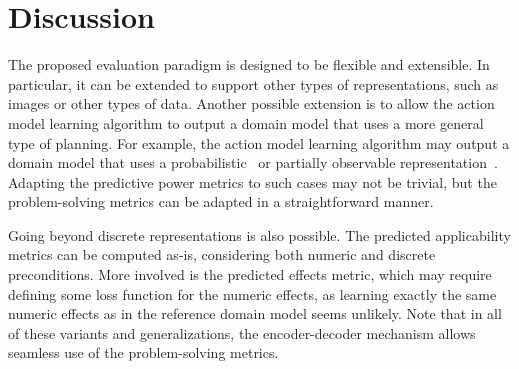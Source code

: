 \documentclass{article}
\theoremstyle{definition}
\theoremstyle{remark}
\newcommand{\sam}{\ac{SAM}\xspace}
\newif\ifaddcomments
\newcommand{\roni}[1]{\ifaddcomments{\textcolor{red}{[Roni: #1]}}\fi}
\newcommand{\argaman}[1]{\ifaddcomments{\textcolor{blue}{[Argaman: #1]}}\fi}
\begin{document}
\argaman{
\paragraph{Problem-Solving Metrics:} 
OffLAM achieved the highest problem-solving rates across all domains. Notably, in four domains, it was the only algorithm to produce a model capable of solving the entire test set. In the \textsc{rovers}, \textsc{elevators}, \textsc{tpp}, and \textsc{nomystery} domains, both \sam and NOLAM added excessive preconditions that reduced the models' applicability, leading to lower success rates. An exception is the \textsc{childsnack} domain, which includes a constant unsupported by both NOLAM and OffLAM. Although plans were generated, they were deemed inapplicable, as shown in Figure~\ref{fig:false-positive-plans}.
}




\section{Discussion}
\roni{For all: please read and let me know what you think by adding comments in the text (e.g., add text like this ``[[YourName: bla bla bla'']]) or editting.}
The proposed evaluation paradigm is designed to be flexible and extensible. 
In particular, it can be extended to support other types of representations, such as images or other types of data. 
Another possible extension is to allow the action model learning algorithm to output a domain model that uses a more general type of planning. 
For example, the action model learning algorithm may output a domain model that uses a probabilistic~\citep{xi2024neuro} or partially observable representation~\citep{le2024learning}. 
Adapting the predictive power metrics to such cases may not be trivial, but the problem-solving metrics can be adapted in a straightforward manner.


Going beyond discrete representations is also possible. 
The predicted applicability metrics can be computed as-is, considering both numeric and discrete preconditions.
More involved is the predicted effects metric, which may require defining some loss function for the numeric effects, as learning exactly the same numeric effects as in the reference domain model seems unlikely. 
Note that in all of these variants and generalizations, the encoder-decoder mechanism allows seamless use of the problem-solving metrics. 
\end{document}
